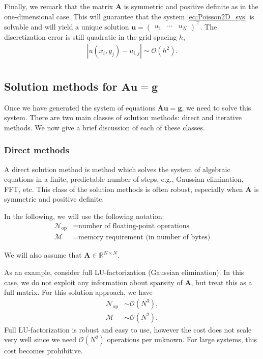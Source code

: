 Finally, we remark that the matrix $\bm A$ is symmetric and positive definite as
in the one-dimensional case. This will guarantee that the system
\eqref{eq:Poisson2D_sys} is solvable and will yield a unique solution
$\bm u = \begin{pmatrix}u_1&\cdots&u_N\end{pmatrix}^\intercal$. The
discretization error is still quadratic in the grid spacing $h$,
\begin{align*}
  |u(x_i,y_j)-u_{i,j}| \sim \mathcal{O}(h^2). \\
\end{align*}

\subsection{Solution methods for $\bm A \bm u = \bm g$}

Once we have generated the system of equations $\bm A \bm u = \bm g$, we need to
solve this system. There are two main classes of solution methods: direct and
iterative methods. We now give a brief discussion of each of these classes.

\subsubsection{Direct methods}

A direct solution method is method which solves the system of algebraic
equations in a finite, predictable number of steps, e.g., Gaussian elimination,
FFT, etc. This class of the solution methods is often robust, especially when
$\bm A$ is symmetric and positive definite.

In the following, we will use the following notation:
\begin{align*}
  \mathcal{N}_\text{op} &= \text{number of floating-point operations} \\
  \mathcal{M} &= \text{memory requirement (in number of bytes)}
\end{align*}

We will also assume that $\bm A \in \mathbb{R}^{N \times N}$.

As an example, consider full LU-factorization (Gaussian elimination). In this
case, we do not exploit any information about sparsity of $\bm A$, but treat
this as a full matrix. For this solution approach, we have
\begin{align*}
  \mathcal{N}_\text{op} &\sim \mathcal{O}(N^3), \\
  \mathcal{M} &\sim \mathcal{O}(N^2).
\end{align*}
Full LU-factorization is robust and easy to use, however the cost does not scale
very well since we need $\mathcal{O}(N^2)$ operations per unknown. For large
systems, this cost becomes prohibitive.

